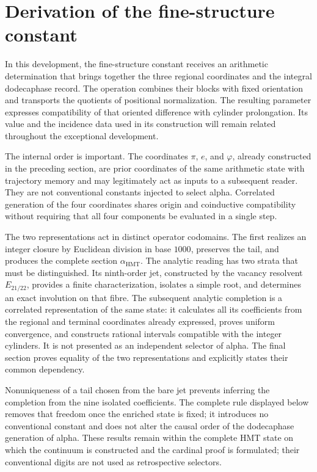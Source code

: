 \section{Derivation of the fine-structure constant}
\label{sec:alpha}

In this development, the fine-structure constant receives an arithmetic
determination that brings together the three regional coordinates and the integral
dodecaphase record. The operation combines their blocks with fixed orientation and
transports the quotients of positional normalization. The resulting
parameter expresses compatibility of that oriented difference with
cylinder prolongation. Its value and the incidence data
used in its construction will remain related throughout the
exceptional development.

The internal order is important. The coordinates \(\pi\),
\(e\), and \(\varphi\), already constructed in the preceding section, are prior
coordinates of the same arithmetic state with trajectory memory and may legitimately act as
inputs to a subsequent reader. They are not conventional constants
injected to select alpha. Correlated generation of the four coordinates shares origin and
coinductive compatibility without requiring that all four
components be evaluated in a single step.

The two representations act in distinct operator codomains. The first
realizes an integer closure by Euclidean division in base \(1000\), preserves the
tail, and produces the complete section \(\alpha_{\mathrm{HMT}}\). The
analytic reading has two strata that must be distinguished. Its ninth-order jet,
constructed by the vacancy resolvent \(E_{21/22}\), provides a
finite characterization, isolates a simple root, and determines an exact
involution on that fibre. The subsequent analytic completion is a
correlated representation of the same state: it calculates all its coefficients
from the regional and terminal coordinates already expressed, proves
uniform convergence, and constructs rational intervals compatible with the
integer cylinders. It is not presented as an independent selector of alpha. The
final section proves equality of the two representations and explicitly
states their common dependency.

Nonuniqueness of a tail chosen from the bare jet prevents inferring the
completion from the nine isolated coefficients. The complete rule
displayed below removes that freedom once the enriched state is fixed;
it introduces no conventional constant and does not alter the causal order of
the dodecaphase generation of alpha. These results remain within the complete HMT
state on which the continuum is constructed and the cardinal proof is
formulated; their conventional digits are not used as retrospective selectors.

